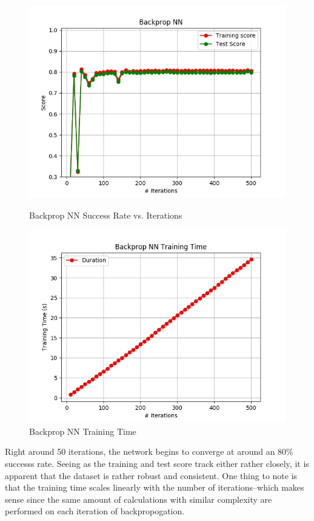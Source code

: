 \documentclass[h]{article}
\begin{document}
 \begin{figure}[H]
      \includegraphics[width=1\textwidth,keepaspectratio]{backprop_nn_1.jpg} 
      \caption*{Backprop NN Success Rate vs. Iterations} 
   \endminipage\hfill
      \includegraphics[width=1\textwidth,keepaspectratio]{backprop_nn_time_1.jpg} 
      \caption*{Backprop NN Training Time} 
   \endminipage\hfill
\end{figure}

Right around 50 iterations, the network begins to converge at around an 80\% 
successs rate.  Seeing as the training and test score track either rather 
closely, it is apparent that the dataset is rather robust and consistent.  One 
thing to note is that the training time scales linearly with the number of 
iterations--which makes sense since the same amount of calculations with similar 
complexity are performed on each iteration of backpropogation.  
\end{document}
